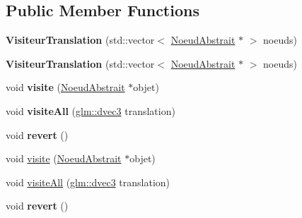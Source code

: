 \subsection*{Public Member Functions}
\begin{DoxyCompactItemize}
\item 
\hypertarget{class_visiteur_translation_a909fd9d07ccdf592eb49ecab6efe35c2}{{\bfseries Visiteur\-Translation} (std\-::vector$<$ \hyperlink{class_noeud_abstrait}{Noeud\-Abstrait} $\ast$ $>$ noeuds)}\label{class_visiteur_translation_a909fd9d07ccdf592eb49ecab6efe35c2}

\item 
\hypertarget{group__inf2990_ga909fd9d07ccdf592eb49ecab6efe35c2}{{\bfseries Visiteur\-Translation} (std\-::vector$<$ \hyperlink{class_noeud_abstrait}{Noeud\-Abstrait} $\ast$ $>$ noeuds)}\label{group__inf2990_ga909fd9d07ccdf592eb49ecab6efe35c2}

\item 
\hypertarget{group__inf2990_ga37d443ac64c0aece4a557a7f9ba38fa1}{void {\bfseries visite} (\hyperlink{class_noeud_abstrait}{Noeud\-Abstrait} $\ast$objet)}\label{group__inf2990_ga37d443ac64c0aece4a557a7f9ba38fa1}

\item 
\hypertarget{group__inf2990_gaed8ad4b7cff9d2f450879ba5786c64c5}{void {\bfseries visite\-All} (\hyperlink{group__core__types_ga7f3287f952e6ccb481231368091702ac}{glm\-::dvec3} translation)}\label{group__inf2990_gaed8ad4b7cff9d2f450879ba5786c64c5}

\item 
\hypertarget{group__inf2990_gad61ada623611fdf4e6c613f1226d2e6d}{void {\bfseries revert} ()}\label{group__inf2990_gad61ada623611fdf4e6c613f1226d2e6d}

\end{DoxyCompactItemize}
{\bf }\par
\begin{DoxyCompactItemize}
\item 
void \hyperlink{class_visiteur_translation_ga37d443ac64c0aece4a557a7f9ba38fa1}{visite} (\hyperlink{class_noeud_abstrait}{Noeud\-Abstrait} $\ast$objet)
\item 
void \hyperlink{class_visiteur_translation_gaed8ad4b7cff9d2f450879ba5786c64c5}{visite\-All} (\hyperlink{group__core__types_ga7f3287f952e6ccb481231368091702ac}{glm\-::dvec3} translation)
\item 
\hypertarget{class_visiteur_translation_gad61ada623611fdf4e6c613f1226d2e6d}{void {\bfseries revert} ()}\label{class_visiteur_translation_gad61ada623611fdf4e6c613f1226d2e6d}

\end{DoxyCompactItemize}

